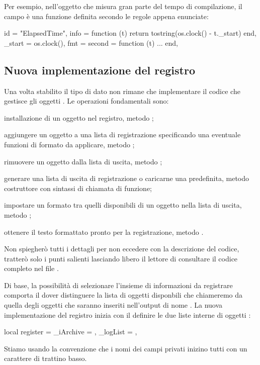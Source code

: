Per esempio, nell'oggetto  che misura gran parte del tempo di
compilazione, il campo  è una funzione definita secondo le regole
appena enunciate:
\begin{lines}
{
    id = "ElapsedTime",
    info = function (t)
        return tostring(os.clock() - t._start)
    end,
    _start = os.clock(),
    fmt = {
        second = function (t) ... end,
    }
}
\end{lines}


\subsection{Nuova implementazione del registro}

Una volta stabilito il tipo di dato non rimane che implementare il codice che
gestisce gli oggetti . Le operazioni fondamentali sono:
\begin{compactitemize}
\item installazione di un oggetto  nel registro, metodo ;
\item aggiungere un oggetto a una lista di registrazione specificando una
eventuale funzioni di formato da applicare, metodo ;
\item rimuovere un oggetto  dalla lista di uscita, metodo
;
\item generare una lista di uscita di registrazione o caricarne una predefinita,
metodo costruttore con sintassi di chiamata di funzione;
\item impostare un formato tra quelli disponibili di un oggetto  nella
lista di uscita, metodo ;
\item ottenere il testo formattato pronto per la registrazione, metodo
.
\end{compactitemize}

Non spiegherò tutti i dettagli per non eccedere con la descrizione del codice,
tratterò solo i punti salienti lasciando libero il lettore di consultare il
codice completo nel file .

Di base, la possibilità di selezionare l'insieme di informazioni da registrare
comporta il dover distinguere la lista di oggetti disponbili che chiameremo
 da quella degli oggetti che saranno inseriti nell'output di
nome . La nuova implementazione del registro inizia con il
definire le due liste interne di oggetti :
\begin{lines}
local register = {
    _iArchive = {},
    _logList = {},
}
\end{lines}
Stiamo usando la convenzione che i nomi dei campi privati inizino tutti con un
carattere di trattino basso.

